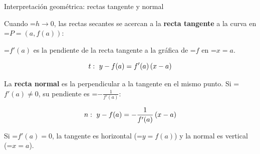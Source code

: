 \documentclass[11pt,a4paper]{article}
\newcommand{\fmm}[1]{\setbox0=\hbox{$#1$}\ifdim\wd0>\linewidth\fmdisp{#1}\else\mbox{\box0}\fi}
\newcommand{\fmdisp}[1]{\[\setbox2=\hbox{$\displaystyle #1$}\ifdim\wd2>\linewidth\resizebox{\linewidth}{!}{\box2}\else\box2\fi\]}
\begin{document}
\begin{fmprop}{Interpretación geométrica: rectas tangente y normal}
\par\noindent \begin{minipage}[t]{0.48\linewidth}\vspace{0pt}\raggedright Cuando \fmm{h\to0}, las rectas secantes se acercan a la \textbf{recta tangente} a la curva en \fmm{P=(a,f(a))}:

\begin{center}\colorbox{fmyellow!45}{\parbox{0.9\linewidth}{\centering\strut \fmm{f'(a)} es la pendiente de la recta tangente a la gráfica de \fmm{f} en \fmm{x=a}.\strut}}\end{center}

\fmdisp{t:\ y-f(a)=f'(a)\,(x-a)}

La \textbf{recta normal} es la perpendicular a la tangente en el mismo punto. Si \fmm{f'(a)\neq0}, su pendiente es \fmm{-\frac{1}{f'(a)}}:

\fmdisp{n:\ y-f(a)=-\frac{1}{f'(a)}\,(x-a)}

Si \fmm{f'(a)=0}, la tangente es horizontal (\fmm{y=f(a)}) y la normal es vertical (\fmm{x=a}).\end{minipage}\hfill\begin{minipage}[t]{0.48\linewidth}\vspace{0pt}\raggedright \begin{center}\end{center}\end{minipage}\par\medskip
\end{fmprop}
\end{document}
